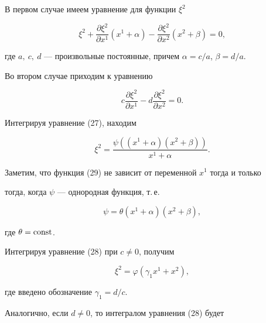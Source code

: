 В первом случае имеем уравнение для функции $\xi^2$


\begin{equation}


\xi^2+ \frac{\partial \xi ^2}{\partial x^1}(x^1+\alpha) -


\frac{\partial \xi^2}{\partial x^2}(x^2+\beta)=0,


\end{equation}


где $a,\ c,\ d$ --- произвольные постоянные, причем $\alpha=c/a$, $\beta=d/a$.





Во втором случае приходим к уравнению


\begin{equation}


c\frac{\partial \xi ^2}{\partial x^1} -


d\frac{\partial \xi^2}{\partial x^2}=0.


\end{equation}





Интегрируя уравнение (27), находим


\begin{equation}


\xi^2=\frac{\psi((x^1+\alpha)(x^2+\beta))}{x^1+\alpha}.


\end{equation}


Заметим, что функция (29) не зависит от переменной $x^1$ тогда и только


тогда, когда $\psi$ --- однородная функция, т.\,е.


\begin{equation}


\psi=\theta (x^1+\alpha)(x^2+\beta),\tag{$29'$}


\end{equation}


где $\theta=\operatorname{const}$.


Интегрируя уравнение (28) при $c\neq 0$, получим


\begin{equation}


\xi^2=\varphi(\gamma_1x^1+x^2),


\end{equation}


где введено обозначение $\gamma_1=d/c$.


Аналогично, если $d\neq 0$, то интегралом уравнения (28) будет


